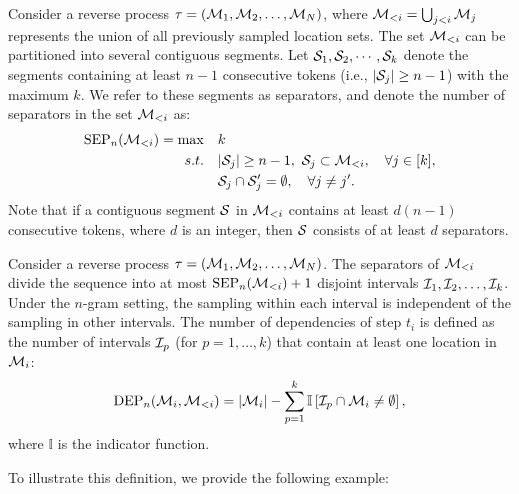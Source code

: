 \begin{definition}
\label{def:sep_rev}
    Consider a reverse process $\tau = ({\mathcal{M}}_1, {\mathcal{M}}_2, \dots, {\mathcal{M}}_N)$, where ${\mathcal{M}}_{<i} = \bigcup_{j<i} {\mathcal{M}}_j$ represents the union of all previously sampled location sets. The set ${\mathcal{M}}_{<i}$ can be partitioned into several contiguous segments. Let ${\mathcal{S}}_1,{\mathcal{S}}_2,\cdots,{\mathcal{S}}_k$ denote the segments containing at least $n-1$ consecutive tokens (i.e., $ |{\mathcal{S}}_j|\geq n-1$) with the maximum $k$.
    We refer to these segments as separators, and denote the number of separators in the set ${\mathcal{M}}_{<i}$ as:
    \begin{align*}
        \SEP_n(\gM_{<i})=\max\quad & k\\
        s.t.\quad &|\gS_j|\geq n-1,\ \gS_j\subset\gM_{<i},\quad\forall j\in[k],\\
        &\gS_j\cap\gS_j'=\emptyset,\quad\forall j\neq j'.
    \end{align*}
    Note that if a contiguous segment ${\mathcal{S}}$ in ${\mathcal{M}}_{<i}$ contains at least $d(n-1)$ consecutive tokens, where $d$ is an integer, then ${\mathcal{S}}$ consists of at least $d$ separators.
\end{definition}


\begin{definition}
\label{def:dep_rev}
    Consider a reverse process $\tau = ({\mathcal{M}}_1, {\mathcal{M}}_2, \dots, {\mathcal{M}}_N)$. The separators of ${\mathcal{M}}_{<i}$ divide the sequence into at most $\operatorname{SEP}_n({\mathcal{M}}_{<i})+1$ disjoint intervals ${\mathcal{I}}_1, {\mathcal{I}}_2, \dots, {\mathcal{I}}_k$. Under the $n$-gram setting, the sampling within each interval is independent of the sampling in other intervals. The number of dependencies of step $t_i$ is defined as the number of intervals ${\mathcal{I}}_p$ (for $p = 1, \dots, k$) that contain at least one location in ${\mathcal{M}}_i$:
    \[
    \operatorname{DEP}_n({\mathcal{M}}_i, {\mathcal{M}}_{<i}) = |{\mathcal{M}}_i| - \sum_{p=1}^{k} \mathbb{I}\left[{\mathcal{I}}_p \cap {\mathcal{M}}_i \neq \emptyset\right],
    \]
    where $\mathbb{I}$ is the indicator function.
\end{definition}

\noindent To illustrate this definition, we provide the following example:

